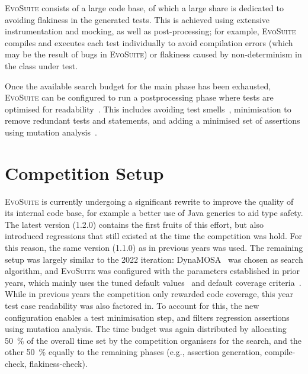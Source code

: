 \documentclass[10pt,conference]{IEEEtran}
\newcommand{\EVOSUITE}{\textsc{EvoSuite}\xspace}
\begin{document}
\EVOSUITE consists of a large code base, of which a large share is
dedicated to avoiding flakiness in the generated tests. This is
achieved using extensive instrumentation and mocking, as well as
post-processing; for example, \EVOSUITE compiles and executes each
test individually to avoid compilation errors (which may be the result
of bugs in \EVOSUITE) or flakiness caused by non-determinism in the
class under test.

Once the available search budget for the main phase has been exhausted,
\EVOSUITE can be configured to run a postprocessing phase where tests are optimised for
readability~\cite{FrA11c,FrA13a}. This includes avoiding test
smells~\cite{panichella2020revisiting}, minimisation to remove redundant tests
and statements, and adding a minimised set of assertions using mutation
analysis~\cite{10.1109/TSE.2011.93}.


\section{Competition Setup}\label{sec:setup}

\EVOSUITE is currently undergoing a significant rewrite to improve the quality
of its internal code base, for example a better use of Java generics to aid
type safety. The latest version (1.2.0) contains the first fruits of this effort,
but also introduced regressions that still existed at the time the competition was
hold. For this reason, the same version (1.1.0) as in previous years was used.
The remaining setup was largely similar to the 2022 iteration: DynaMOSA~\cite{dynamosa}
was chosen as search algorithm, and \EVOSUITE was configured with the parameters
established in prior years, which mainly uses the tuned default
values~\cite{arcuri2013parameter} and default coverage criteria~\cite{rojas2015combining}.
%
%
While in previous years the competition only rewarded code coverage, this year
test case readability was also factored in. To account for this, the new configuration
enables a test minimisation step, and filters regression assertions using mutation analysis.
%
The time budget was again distributed by allocating \SI{50}{\percent} of the overall time
set by the competition organisers for the search, and the other \SI{50}{\percent} equally to
the remaining phases (e.g., assertion generation, compile-check, flakiness-check).
\end{document}
